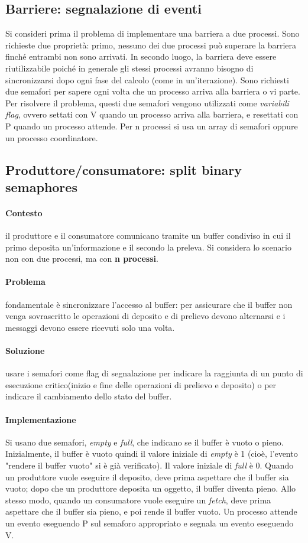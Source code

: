 \documentclass[10pt,a4paper]{article}
\begin{document}
\subsection{Barriere: segnalazione di eventi}
Si consideri prima il problema di implementare una barriera a due processi. Sono richieste due proprietà: primo, nessuno dei due processi può superare la barriera finché entrambi non sono arrivati. In secondo luogo, la barriera deve essere riutilizzabile poiché in generale gli stessi processi avranno bisogno di sincronizzarsi dopo ogni fase del calcolo (come in un'iterazione).
Sono richiesti due semafori per sapere ogni volta che un processo arriva alla barriera o vi parte.
Per risolvere il problema, questi due semafori vengono utilizzati come \textit{variabili flag}, ovvero settati con V quando un processo arriva alla barriera, e resettati con P quando un processo attende.
Per n processi si usa un array di semafori oppure un processo coordinatore.

\subsection{Produttore/consumatore: split binary semaphores}
\paragraph{Contesto} il produttore e il consumatore comunicano tramite un buffer condiviso in cui il primo deposita un'informazione e il secondo la preleva. Si considera lo scenario non con due processi, ma con \textbf{n processi}.
\paragraph{Problema} fondamentale è sincronizzare l'accesso al buffer: per assicurare che il buffer non venga sovrascritto le operazioni di deposito e di prelievo devono alternarsi e i messaggi devono essere ricevuti solo una volta.
\paragraph{Soluzione} usare i semafori come flag di segnalazione per indicare la raggiunta di un punto di esecuzione critico(inizio e fine delle operazioni di prelievo e deposito) o per indicare il cambiamento dello stato del buffer.
\paragraph{Implementazione} Si usano due semafori, \textit{empty} e \textit{full}, che indicano se il buffer è vuoto o pieno. Inizialmente, il buffer è vuoto quindi il valore iniziale di \textit{empty} è 1 (cioè, l'evento "rendere il buffer vuoto" si è già verificato). Il valore iniziale di \textit{full} è 0. Quando un produttore vuole eseguire il deposito, deve prima aspettare che il buffer sia vuoto; dopo che un produttore deposita un oggetto, il buffer diventa pieno. Allo stesso modo, quando un consumatore vuole eseguire un \textit{fetch}, deve prima aspettare che il buffer sia pieno, e poi rende il buffer vuoto. 
Un processo attende un evento eseguendo P sul semaforo appropriato e segnala un evento eseguendo V.
\end{document}
